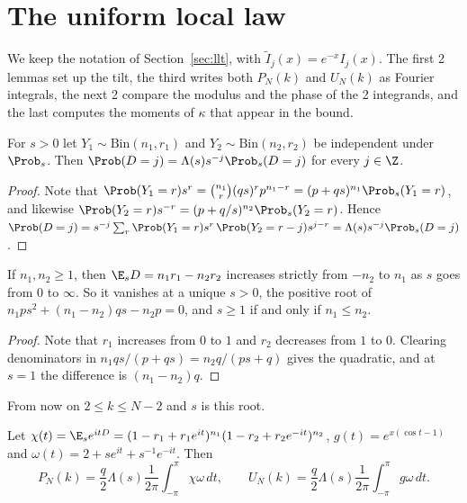 \section{The uniform local law}\label{app:llt}

We keep the notation of Section~\ref{sec:llt}, with $\tilde I_j(x)=e^{-x}I_j(x)$.
The first 2 lemmas set up the tilt, the third writes both $P_N(k)$ and $U_N(k)$
as Fourier integrals, the next 2 compare the modulus and the phase of the 2
integrands, and the last computes the moments of $\kappa$ that appear in the
bound.

\begin{lemma}[tilting]\label{lem:llt-tilt}
For $s>0$ let $Y_1\sim\mathrm{Bin}(n_1,r_1)$ and $Y_2\sim\mathrm{Bin}(n_2,r_2)$ be independent
under $\Prob_s$. Then $\Prob(D=j)=\Lambda(s)s^{-j}\Prob_s(D=j)$ for every $j\in\Z$.
\end{lemma}

\begin{proof}
Note that $\Prob(Y_1=r)s^r=\binom{n_1}r(qs)^rp^{n_1-r}=(p+qs)^{n_1}\Prob_s(Y_1=r)$, and
likewise $\Prob(Y_2=r)s^{-r}=(p+q/s)^{n_2}\Prob_s(Y_2=r)$. Hence
$\Prob(D=j)=s^{-j}\sum_r\Prob(Y_1=r)s^r\,\Prob(Y_2=r-j)s^{j-r}=\Lambda(s)s^{-j}\Prob_s(D=j)$.
\end{proof}

\begin{lemma}[saddle]\label{lem:llt-saddle}
If $n_1,n_2\ge1$, then $\E_sD=n_1r_1-n_2r_2$ increases strictly from $-n_2$ to $n_1$ as $s$ goes
from $0$ to $\infty$. So it vanishes at a unique $s>0$, the positive root of
$n_1ps^2+(n_1-n_2)qs-n_2p=0$, and $s\ge1$ if and only if $n_1\le n_2$.
\end{lemma}

\begin{proof}
Note that $r_1$ increases from $0$ to $1$ and $r_2$ decreases from $1$ to $0$. Clearing
denominators in $n_1qs/(p+qs)=n_2q/(ps+q)$ gives the quadratic, and at $s=1$ the difference is
$(n_1-n_2)q$.
\end{proof}

From now on $2\le k\le N-2$ and $s$ is this root.

\begin{lemma}\label{lem:llt-fourier}
Let $\chi(t)=\E_se^{itD}=(1-r_1+r_1e^{it})^{n_1}(1-r_2+r_2e^{-it})^{n_2}$,
$g(t)=e^{x(\cos t-1)}$ and $\omega(t)=2+se^{it}+s^{-1}e^{-it}$. Then
\[
P_N(k)=\frac q2\Lambda(s)\frac1{2\pi}\int_{-\pi}^{\pi}\chi\omega\,dt,\qquad
U_N(k)=\frac q2\Lambda(s)\frac1{2\pi}\int_{-\pi}^{\pi}g\omega\,dt.
\]
\end{lemma}

